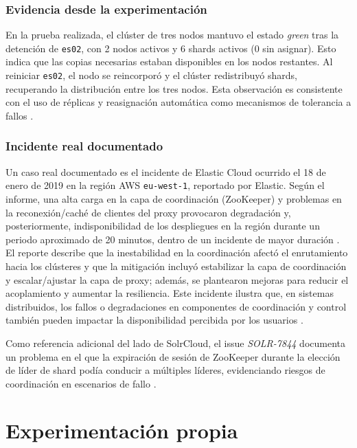 \documentclass[12pt,a4paper]{article}
\begin{document}
\subsubsection{Evidencia desde la experimentación}
En la prueba realizada, el clúster de tres nodos mantuvo el estado \textit{green} tras la detención de \texttt{es02}, con 2 nodos activos y 6 shards activos (0 sin asignar). Esto indica que las copias necesarias estaban disponibles en los nodos restantes. Al reiniciar \texttt{es02}, el nodo se reincorporó y el clúster redistribuyó shards, recuperando la distribución entre los tres nodos. Esta observación es consistente con el uso de réplicas y reasignación automática como mecanismos de tolerancia a fallos \cite{elastic_nodes_shards,elastic_resilience}.

\subsubsection{Incidente real documentado}
Un caso real documentado es el incidente de Elastic Cloud ocurrido el 18 de enero de 2019 en la región AWS \texttt{eu-west-1}, reportado por Elastic. Según el informe, una alta carga en la capa de coordinación (ZooKeeper) y problemas en la reconexión/caché de clientes del proxy provocaron degradación y, posteriormente, indisponibilidad de los despliegues en la región durante un periodo aproximado de 20 minutos, dentro de un incidente de mayor duración \cite{elastic_cloud_incident_2019}. El reporte describe que la inestabilidad en la coordinación afectó el enrutamiento hacia los clústeres y que la mitigación incluyó estabilizar la capa de coordinación y escalar/ajustar la capa de proxy; además, se plantearon mejoras para reducir el acoplamiento y aumentar la resiliencia. Este incidente ilustra que, en sistemas distribuidos, los fallos o degradaciones en componentes de coordinación y control también pueden impactar la disponibilidad percibida por los usuarios \cite{elastic_cloud_incident_2019,elastic_resilience}.

Como referencia adicional del lado de SolrCloud, el issue \textit{SOLR-7844} documenta un problema en el que la expiración de sesión de ZooKeeper durante la elección de líder de shard podía conducir a múltiples líderes, evidenciando riesgos de coordinación en escenarios de fallo \cite{solr_jira_7844,solr_shards_indexing}.

\section{Experimentación propia}
\label{sec:experimentacion}
\end{document}
